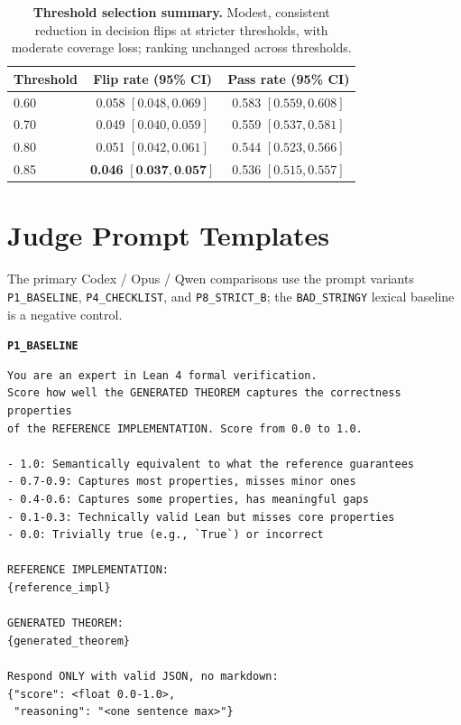 \documentclass{article}
\begin{document}
\begin{table}[h]
  \centering
  \small
  \begin{tabular}{lcc}
    \toprule
    \textbf{Threshold} & \textbf{Flip rate (95\% CI)} & \textbf{Pass rate (95\% CI)} \\
    \midrule
    0.60 & 0.058 $[0.048, 0.069]$ & 0.583 $[0.559, 0.608]$ \\
    0.70 & 0.049 $[0.040, 0.059]$ & 0.559 $[0.537, 0.581]$ \\
    0.80 & 0.051 $[0.042, 0.061]$ & 0.544 $[0.523, 0.566]$ \\
    0.85 & \textbf{0.046} $[\textbf{0.037}, \textbf{0.057}]$ & 0.536 $[0.515, 0.557]$ \\
    \bottomrule
  \end{tabular}
  \caption{\textbf{Threshold selection summary.} Modest, consistent reduction in decision flips at stricter thresholds, with moderate coverage loss; ranking unchanged across thresholds.}
  \label{tab:exp13_threshold_sweep}
\end{table}

\section{Judge Prompt Templates}\label{app:judge-prompts}
The primary Codex / Opus / Qwen comparisons use the prompt variants \texttt{P1\_BASELINE}, \texttt{P4\_CHECKLIST}, and \texttt{P8\_STRICT\_B}; the \texttt{BAD\_STRINGY} lexical baseline is a negative control.

\noindent\textbf{\texttt{P1\_BASELINE}}\par
\vspace{0.25em}\begin{lstlisting}[style=promptstyle]
You are an expert in Lean 4 formal verification.
Score how well the GENERATED THEOREM captures the correctness properties
of the REFERENCE IMPLEMENTATION. Score from 0.0 to 1.0.

- 1.0: Semantically equivalent to what the reference guarantees
- 0.7-0.9: Captures most properties, misses minor ones
- 0.4-0.6: Captures some properties, has meaningful gaps
- 0.1-0.3: Technically valid Lean but misses core properties
- 0.0: Trivially true (e.g., `True`) or incorrect

REFERENCE IMPLEMENTATION:
{reference_impl}

GENERATED THEOREM:
{generated_theorem}

Respond ONLY with valid JSON, no markdown:
{"score": <float 0.0-1.0>,
 "reasoning": "<one sentence max>"}
\end{lstlisting}
\end{document}
